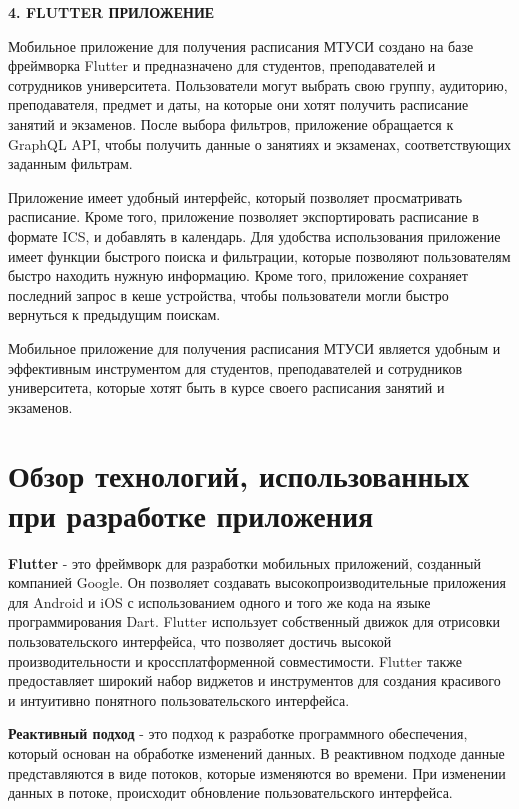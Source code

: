 

\newpage
\begin{center}
    \textbf{\large 4. FLUTTER ПРИЛОЖЕНИЕ}
\end{center}

Мобильное приложение для получения расписания МТУСИ создано на базе фреймворка Flutter 
и предназначено для студентов, преподавателей и сотрудников университета. 
Пользователи могут выбрать свою группу, аудиторию, преподавателя, предмет и даты, 
на которые они хотят получить расписание занятий и экзаменов. 
После выбора фильтров, приложение обращается к GraphQL API, чтобы получить данные о занятиях и экзаменах, 
соответствующих заданным фильтрам.

Приложение имеет удобный интерфейс, который позволяет просматривать расписание. 
Кроме того, приложение позволяет экспортировать расписание в формате ICS, и добавлять в календарь.
Для удобства использования приложение имеет функции быстрого поиска и фильтрации,
которые позволяют пользователям быстро находить нужную информацию.
Кроме того, приложение сохраняет последний запрос в кеше устройства,
чтобы пользователи могли быстро вернуться к предыдущим поискам.

Мобильное приложение для получения расписания МТУСИ является удобным и
эффективным инструментом для студентов, преподавателей и сотрудников университета,
которые хотят быть в курсе своего расписания занятий и экзаменов.

\section{Обзор технологий, использованных при разработке приложения}

\textbf{Flutter} - это фреймворк для разработки мобильных приложений,
созданный компанией Google.
Он позволяет создавать высокопроизводительные приложения для Android и iOS
с использованием одного и того же кода на языке программирования Dart.
Flutter использует собственный движок для отрисовки пользовательского интерфейса,
что позволяет достичь высокой производительности и кроссплатформенной совместимости.
Flutter также предоставляет широкий набор виджетов и инструментов для создания красивого
и интуитивно понятного пользовательского интерфейса.

\textbf{Реактивный подход} - это подход к разработке программного обеспечения,
который основан на обработке изменений данных. 
В реактивном подходе данные представляются в виде потоков,
которые изменяются во времени.
При изменении данных в потоке, происходит обновление пользовательского интерфейса.

